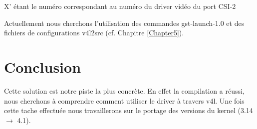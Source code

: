 X’ étant le numéro correspondant au numéro du driver vidéo du port CSI-2

Actuellement nous cherchons l’utilisation des commandes gst-launch-1.0 et des
fichiers de configurations v4l2src (cf. Chapitre \ref{Chapter5}).

\section{Conclusion}

Cette solution est notre piste la plus concrète. En effet la compilation a réussi,
nous cherchons à comprendre comment utiliser le driver à travers v4l. Une fois cette
tache effectuée nous travaillerons sur le portage des versions du kernel (3.14 $\rightarrow$ 4.1).


